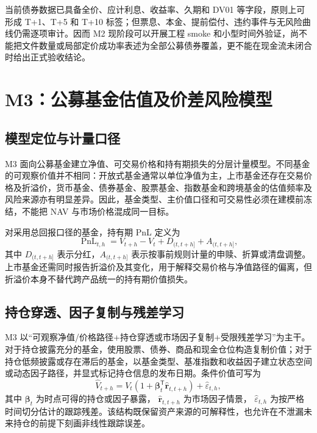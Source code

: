 当前债券数据已具备全价、应计利息、收益率、久期和 DV01 等字段，原则上可形成 T+1、T+5 和 T+10 标签；但票息、本金、提前偿付、违约事件与无风险曲线仍需逐项审计。因而 M2 现阶段可以开展工程 smoke 和小型时间外验证，尚不能把文件数量或局部定价成功率表述为全部公募债券覆盖，更不能在现金流未闭合时给出正式验收结论。

\section{M3：公募基金估值及价差风险模型}
\label{sec:m3-fund}

\subsection{模型定位与计量口径}

M3 面向公募基金建立净值、可交易价格和持有期损失的分层计量模型。不同基金的可观察价值并不相同：开放式基金通常以单位净值为主，上市基金还存在交易价格及折溢价，货币基金、债券基金、股票基金、指数基金和跨境基金的估值频率及风险来源亦有明显差异。因此，基金类型、主价值口径和可交易性必须在建模前冻结，不能把 NAV 与市场价格混成同一目标。

对采用总回报口径的基金，持有期 PnL 定义为
\begin{equation}
  \operatorname{PnL}_{t,h}
  =V_{t+h}-V_t+D_{(t,t+h]}+A_{(t,t+h]},
\end{equation}
其中 \(D_{(t,t+h]}\) 表示分红，\(A_{(t,t+h]}\) 表示按事前规则计量的申赎、折算或清盘调整。上市基金还需同时报告折溢价及其变化，用于解释交易价格与净值路径的偏离，但折溢价本身不替代跨产品统一的持有期价值损失。

\subsection{持仓穿透、因子复制与残差学习}

M3 以“可观察净值/价格路径+持仓穿透或市场因子复制+受限残差学习”为主干。对于持仓披露充分的基金，使用股票、债券、商品和现金仓位构造复制价值；对于持仓低频披露或存在滞后的基金，以基金类型、基准指数和收益因子建立状态空间或动态因子路径，并显式标记持仓信息的发布日期。条件价值可写为
\begin{equation}
  \widehat V_{t+h}
  =V_t\left(1+\boldsymbol{\beta}_{t}^{\mathsf T}
  \widehat{\boldsymbol r}_{t,t+h}\right)
  +\widehat\varepsilon_{t,h},
\end{equation}
其中 \(\boldsymbol{\beta}_{t}\) 为时点可得的持仓或因子暴露，
\(\widehat{\boldsymbol r}_{t,t+h}\) 为市场因子情景，
\(\widehat\varepsilon_{t,h}\) 为按严格时间切分估计的跟踪残差。该结构既保留资产来源的可解释性，也允许在不泄漏未来持仓的前提下刻画非线性跟踪误差。

